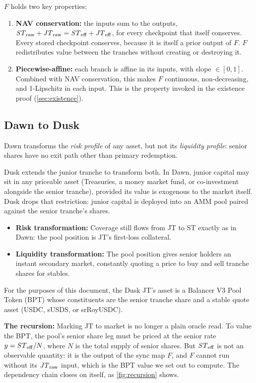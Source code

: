 $F$ holds two key properties:

\begin{enumerate}
  \item \textbf{NAV conservation:} the inputs sum to the outputs,
    $\mathit{ST}_{\mathrm{raw}} + \mathit{JT}_{\mathrm{raw}} = \mathit{ST}_{\mathrm{eff}} + \mathit{JT}_{\mathrm{eff}}$, for every checkpoint that
    itself conserves. Every stored checkpoint conserves, because it is
    itself a prior output of $F$. $F$ redistributes value between the tranches without
    creating or destroying it.
  \item \textbf{Piecewise-affine:} each branch is affine in its inputs,
    with slope $\in [0, 1]$. Combined with NAV conservation, this makes
    $F$ continuous, non-decreasing, and 1-Lipschitz in each input. This
    is the property invoked in the existence proof
    (\cref{sec:existence}).
\end{enumerate}

\subsection{Dawn to Dusk}
\label{sec:overview:dawn-to-dusk}

Dawn transforms the \emph{risk profile} of any asset, but not its
\emph{liquidity profile}: senior shares have no exit path other than
primary redemption.

Dusk extends the junior tranche to transform both. In Dawn, junior
capital may sit in any priceable asset (Treasuries, a money market
fund, or co-investment alongside the senior tranche), provided its
value is exogenous to the market itself. Dusk drops that restriction:
junior capital is deployed into an AMM pool paired against the senior
tranche's shares.

\begin{itemize}
  \item \textbf{Risk transformation:} Coverage still flows from JT to ST exactly
    as in Dawn: the pool position is JT's first-loss collateral.
  \item \textbf{Liquidity transformation:} The pool position gives senior
    holders an instant secondary market, constantly quoting a price to
    buy and sell tranche shares for stables.
\end{itemize}

For the purposes of this document, the Dusk JT's asset is a Balancer V3
Pool Token (BPT) whose constituents are the senior tranche share and a
stable quote asset (USDC, sUSDS, or srRoyUSDC).

\textbf{The recursion:} Marking JT to market is no longer a plain oracle
read. To value the BPT, the pool's senior share leg must be priced at
the senior rate $y = \mathit{ST}_{\mathrm{eff}} / N$, where $N$ is the total supply of senior shares.
But $\mathit{ST}_{\mathrm{eff}}$ is not an observable quantity: it is the output of the
sync map $F$, and $F$ cannot run without its $\mathit{JT}_{\mathrm{raw}}$ input, which is
the BPT value we set out to compute. The dependency chain closes on
itself, as \cref{fig:recursion} shows.

